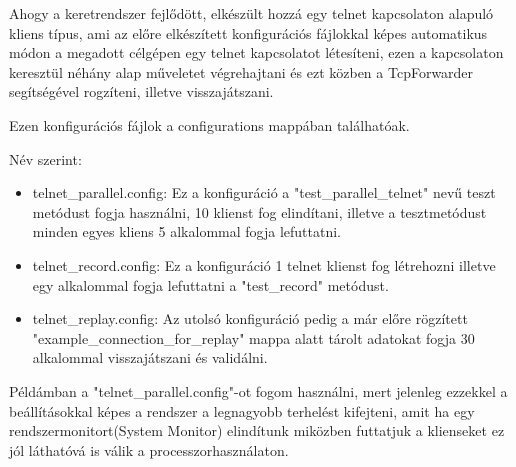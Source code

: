 \documentclass[a4paper,12pt,oneside]{report}
\begin{document}
Ahogy a keretrendszer fejlődött, elkészült hozzá egy telnet kapcsolaton alapuló kliens típus, ami az előre elkészített konfigurációs fájlokkal képes automatikus módon a megadott célgépen egy telnet kapcsolatot létesíteni, ezen a kapcsolaton keresztül néhány alap műveletet végrehajtani és ezt közben a TcpForwarder segítségével rogzíteni, illetve visszajátszani.

Ezen konfigurációs fájlok a configurations mappában találhatóak.

Név szerint:
\begin{itemize}
\itemsep0em
\item telnet\_parallel.config: Ez a konfiguráció a "test\_parallel\_telnet" nevű teszt metódust fogja használni, 10 klienst fog elindítani, illetve a tesztmetódust minden egyes kliens 5 alkalommal fogja lefuttatni.
\item telnet\_record.config: Ez a konfiguráció 1 telnet klienst fog létrehozni illetve egy alkalommal fogja lefuttatni a "test\_record" metódust.
\item telnet\_replay.config: Az utolsó konfiguráció pedig a már előre rögzített "example\_connection\_for\_replay" mappa alatt tárolt adatokat fogja 30 alkalommal visszajátszani és validálni.
\end{itemize}


Példámban a "telnet\_parallel.config"-ot fogom használni, mert jelenleg ezzekkel a beállításokkal képes a rendszer a legnagyobb terhelést kifejteni, amit ha egy rendszermonitort(System Monitor) elindítunk miközben futtatjuk a klienseket ez jól láthatóvá is válik a processzorhasználaton.
\end{document}
